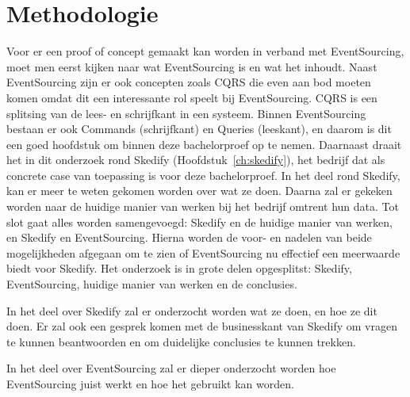 
\chapter{Methodologie}
\label{ch:methodologie}



Voor er een proof of concept gemaakt kan worden in verband met EventSourcing, moet men eerst kijken naar wat EventSourcing is en wat het inhoudt. Naast EventSourcing zijn er ook concepten zoals \gls{CQRS} die even aan bod moeten komen omdat dit een interessante rol speelt bij EventSourcing. \gls{CQRS} is een splitsing van de lees- en schrijfkant in een systeem. Binnen EventSourcing bestaan er ook Commands (schrijfkant) en Queries (leeskant), en daarom is dit een goed hoofdstuk om binnen deze bachelorproef op te nemen. Daarnaast draait het in dit onderzoek rond Skedify (Hoofdstuk~\ref{ch:skedify}), het bedrijf dat als concrete case van toepassing is voor deze bachelorproef. In het deel rond Skedify, kan er meer te weten gekomen worden over wat ze doen. Daarna zal er gekeken worden naar de huidige manier van werken bij het bedrijf omtrent hun data. Tot slot gaat alles worden samengevoegd: Skedify en de huidige manier van werken, en Skedify en EventSourcing. Hierna worden de voor- en nadelen van beide mogelijkheden afgegaan om te zien of EventSourcing nu effectief een meerwaarde biedt voor Skedify. Het onderzoek is in grote delen opgesplitst: Skedify, EventSourcing, huidige manier van werken en de conclusies.

In het deel over Skedify zal er onderzocht worden wat ze doen, en hoe ze dit doen. Er zal ook een gesprek komen met de businesskant van Skedify om vragen te kunnen beantwoorden en om duidelijke conclusies te kunnen trekken.

In het deel over EventSourcing zal er dieper onderzocht worden hoe EventSourcing juist werkt en hoe het gebruikt kan worden.